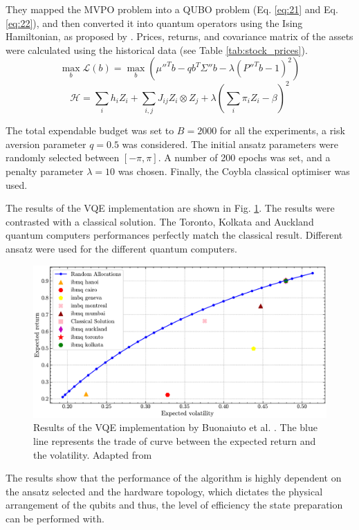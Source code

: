 \documentclass[prx,twocolumn,floatfix,superscriptaddress,longbibliography]{revtex4-1}
\begin{document}
They mapped the MVPO problem into a QUBO problem (Eq. \ref{eq:21} and Eq. \ref{eq:22}), and then converted it into quantum operators using 
the Ising Hamiltonian, as proposed by \cite{Tilly2022}.  Prices, returns, and covariance matrix of the assets were calculated using the historical data (see Table \ref{tab:stock_prices}). 
\begin{equation}
  \label{eq:21}
  \max_{b} \mathcal{L}(b) =\max_{b}\left(\mu''^{T} b - qb^{T} \Sigma'' b - \lambda(P''^{T}b- 1)^2\right)
\end{equation}
\begin{equation}
  \label{eq:22}
  \mathcal{H} = \sum_{i} h_i Z_i + \sum_{i,j} J_{ij} Z_i\otimes Z_j + \lambda \left(\sum_{i}\pi_i Z_i -\beta\right)^2
\end{equation}

The total expendable budget was set to $B=2000$ for all the experiments, a risk aversion parameter $q=0.5$ was considered. The initial ansatz parameters were randomly selected between $[-\pi, \pi]$. A number of 200 epochs was set, and a penalty parameter $\lambda=10$  was chosen. Finally, the Coybla classical optimiser was used. 

The results of the VQE implementation are shown in Fig. \ref{fig:results}. The results were contrasted with a classical solution. The Toronto, Kolkata and Auckland quantum computers performances perfectly match the classical result. Different ansatz were used for the different quantum computers. 
\begin{figure}[t!]
\centering
\includegraphics[width=.90\textwidth]{vqe-results.pdf}
  \caption{\label{fig:results} Results of the VQE implementation by Buonaiuto et al. \cite{Buonaiuto2023}. The blue line represents the trade of curve between the expected return and the volatility. Adapted from 
  \cite{Buonaiuto2023}}
\end{figure}

The results show that the performance of the algorithm is highly dependent on the ansatz selected and the hardware topology, which dictates the physical arrangement of the qubits and thus, the level of efficiency  the state preparation can be performed with. 
\end{document}

